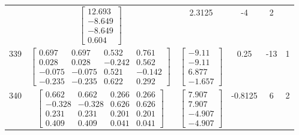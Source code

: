 \documentclass[a4paper,12pt]{article}
\begin{document}
\begin{tabular}{c c c c c c}
&
$\begin{bmatrix} 12.693 \\ -8.649 \\ -8.649 \\ 0.604 \end{bmatrix}$
&
2.3125
&
-4
&
2
\\
339
&
$\begin{bmatrix} 0.697 & 0.697 & 0.532 & 0.761 \\ 0.028 & 0.028 & -0.242 & 0.562 \\ -0.075 & -0.075 & 0.521 & -0.142 \\ -0.235 & -0.235 & 0.622 & 0.292 \end{bmatrix}$
&
$\begin{bmatrix} -9.11 \\ -9.11 \\ 6.877 \\ -1.657 \end{bmatrix}$
&
0.25
&
-13
&
1
\\
340
&
$\begin{bmatrix} 0.662 & 0.662 & 0.266 & 0.266 \\ -0.328 & -0.328 & 0.626 & 0.626 \\ 0.231 & 0.231 & 0.201 & 0.201 \\ 0.409 & 0.409 & 0.041 & 0.041 \end{bmatrix}$
&
$\begin{bmatrix} 7.907 \\ 7.907 \\ -4.907 \\ -4.907 \end{bmatrix}$
&
-0.8125
&
6
&
2
\\
\end{tabular} \egroup \newpage
\end{document}
